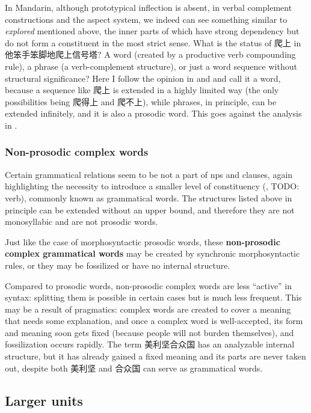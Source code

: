 \documentclass[UTF8, a4paper, oneside, scheme=plain, 12pt]{ctexrep}
\newcommand*{\citesec}[1]{\S~{#1}}
\newcommand*{\citepage}[1]{p.~{#1}}
\newcommand*{\concept}[1]{\textbf{#1}}
\newcommand{\form}[1]{\emph{#1}}
\begin{document}
In Mandarin, although prototypical inflection is absent, 
in verbal complement constructions 
and the aspect system, 
we indeed can see something similar to \form{explored} mentioned above, 
the inner parts of which have strong dependency
but do not form a constituent in the most strict sense.
What is the status of 爬上 in 他笨手笨脚地爬上信号塔?
A word (created by a productive verb compounding rule), 
a phrase (a verb-complement structure),
or just a word sequence without structural significance?
Here I follow the opinion in \citep[\citepage{86}]{feng2000} and \citet{tham2015resultative}
and call it a word,
because a sequence like 爬上 is extended in a highly limited way 
(the only possibilities being 爬得上 and 爬不上),
while phrases, in principle, can be extended infinitely, 
and it is also a prosodic word.
This goes against the analysis in \citep[\citesec{1.2.7}]{zhudexigrammar}.


\subsubsection{Non-prosodic complex words}\label{sec:pos.word.complex}

Certain grammatical relations seem to be not a part of \ac{np}s and clauses,
again highlighting the necessity to introduce a smaller level of constituency
(, TODO: verb),
commonly known as grammatical words.
The structures listed above in principle 
can be extended without an upper bound, 
and therefore they are not monosyllabic and are not prosodic words.

Just like the case of morphosyntactic prosodic words,
these \concept{non-prosodic complex grammatical words} 
may be created by synchronic morphosyntactic rules,
or they may be fossilized or have no internal structure.

Compared to prosodic words,
non-prosodic complex words are less ``active'' in syntax:
splitting them is possible in certain cases
but is much less frequent.
This may be a result of pragmatics:
complex words are created to cover a meaning that needs some explanation,
and once a complex word is well-accepted,
its form and meaning soon gets fixed 
(because people will not burden themselves),
and fossilization occurs rapidly.
The term 美利坚合众国 has an analyzable internal structure,
but it has already gained a fixed meaning 
and its parts are never taken out,
despite both 美利坚 and 合众国 can serve as grammatical words.


\subsection{Larger units}
\end{document}
